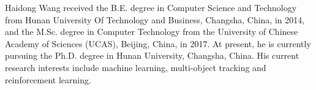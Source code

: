 \documentclass[journal]{IEEEtran}
\begin{document}


%




\begin{IEEEbiography}{Haidong Wang}
	 received the B.E. degree in Computer Science and Technology from Hunan University Of Technology and Business, Changsha, China, in 2014, and the M.Sc. degree in Computer Technology from the University of Chinese Academy of Sciences (UCAS), Beijing, 	China, in 2017. At present, he is currently pursuing the Ph.D. degree in Hunan University, Changsha, China. His current research interests include machine learning,  multi-object tracking and reinforcement learning.
\end{IEEEbiography}
\end{document}
